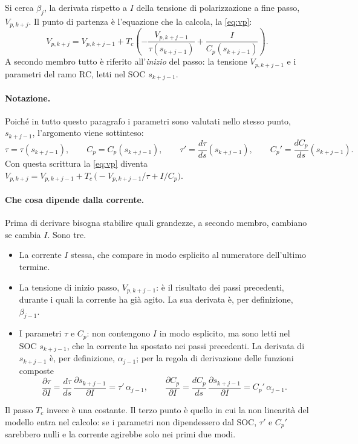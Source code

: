 \documentclass[11pt,a4paper]{article}
\newcommand{\Tc}{T_c}
\begin{document}
Si cerca $\beta_j$, la derivata rispetto a $I$ della tensione di polarizzazione
a fine passo, $V_{p,k+j}$. Il punto di partenza è l'equazione che la calcola,
la \eqref{eq:vp}:
\[
  V_{p,k+j} = V_{p,k+j-1} + \Tc\left(-\frac{V_{p,k+j-1}}{\tau(s_{k+j-1})}
              + \frac{I}{C_p(s_{k+j-1})}\right) .
\]
A secondo membro tutto è riferito all'\emph{inizio} del passo: la tensione
$V_{p,k+j-1}$ e i parametri del ramo RC, letti nel SOC $s_{k+j-1}$.

\paragraph{Notazione.} Poiché in tutto questo paragrafo i parametri sono
valutati nello stesso punto, $s_{k+j-1}$, l'argomento viene sottinteso:
\[
  \tau = \tau(s_{k+j-1}), \qquad C_p = C_p(s_{k+j-1}), \qquad
  \tau' = \frac{d\tau}{ds}(s_{k+j-1}), \qquad
  C_p' = \frac{dC_p}{ds}(s_{k+j-1}) .
\]
Con questa scrittura la \eqref{eq:vp} diventa
$V_{p,k+j} = V_{p,k+j-1} + \Tc\,\bigl(-V_{p,k+j-1}/\tau + I/C_p\bigr)$.

\paragraph{Che cosa dipende dalla corrente.} Prima di derivare bisogna
stabilire quali grandezze, a secondo membro, cambiano se cambia $I$. Sono tre.
\begin{itemize}
  \item La corrente $I$ stessa, che compare in modo esplicito al numeratore
        dell'ultimo termine.
  \item La tensione di inizio passo, $V_{p,k+j-1}$: è il risultato dei passi
        precedenti, durante i quali la corrente ha già agito. La sua derivata
        è, per definizione, $\beta_{j-1}$.
  \item I parametri $\tau$ e $C_p$: non contengono $I$ in modo esplicito, ma
        sono letti nel SOC $s_{k+j-1}$, che la corrente ha spostato nei passi
        precedenti. La derivata di $s_{k+j-1}$ è, per definizione,
        $\alpha_{j-1}$; per la regola di derivazione delle funzioni composte
        \[
          \frac{\partial \tau}{\partial I}
             = \frac{d\tau}{ds}\,\frac{\partial s_{k+j-1}}{\partial I}
             = \tau'\,\alpha_{j-1} ,
          \qquad
          \frac{\partial C_p}{\partial I}
             = \frac{dC_p}{ds}\,\frac{\partial s_{k+j-1}}{\partial I}
             = C_p'\,\alpha_{j-1} .
        \]
\end{itemize}
Il passo $\Tc$ invece è una costante. Il terzo punto è quello in cui la non
linearità del modello entra nel calcolo: se i parametri non dipendessero dal
SOC, $\tau'$ e $C_p'$ sarebbero nulli e la corrente agirebbe solo nei primi due
modi.
\end{document}
